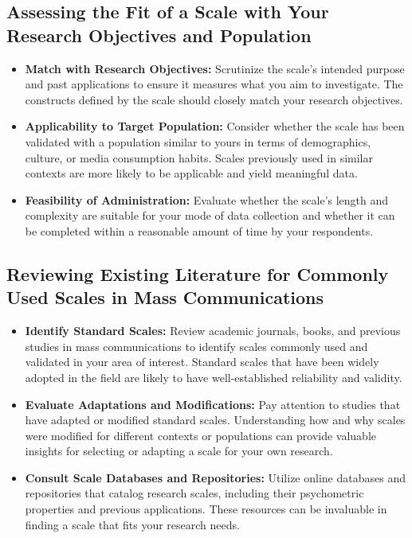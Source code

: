 \documentclass[
]{book}
\begin{document}
\hypertarget{assessing-the-fit-of-a-scale-with-your-research-objectives-and-population}{%
\subsection*{Assessing the Fit of a Scale with Your Research Objectives and Population}\label{assessing-the-fit-of-a-scale-with-your-research-objectives-and-population}}

\begin{itemize}
\item
  \textbf{Match with Research Objectives:} Scrutinize the scale's intended purpose and past applications to ensure it measures what you aim to investigate. The constructs defined by the scale should closely match your research objectives.
\item
  \textbf{Applicability to Target Population:} Consider whether the scale has been validated with a population similar to yours in terms of demographics, culture, or media consumption habits. Scales previously used in similar contexts are more likely to be applicable and yield meaningful data.
\item
  \textbf{Feasibility of Administration:} Evaluate whether the scale's length and complexity are suitable for your mode of data collection and whether it can be completed within a reasonable amount of time by your respondents.
\end{itemize}

\hypertarget{reviewing-existing-literature-for-commonly-used-scales-in-mass-communications}{%
\subsection{Reviewing Existing Literature for Commonly Used Scales in Mass Communications}\label{reviewing-existing-literature-for-commonly-used-scales-in-mass-communications}}

\begin{itemize}
\item
  \textbf{Identify Standard Scales:} Review academic journals, books, and previous studies in mass communications to identify scales commonly used and validated in your area of interest. Standard scales that have been widely adopted in the field are likely to have well-established reliability and validity.
\item
  \textbf{Evaluate Adaptations and Modifications:} Pay attention to studies that have adapted or modified standard scales. Understanding how and why scales were modified for different contexts or populations can provide valuable insights for selecting or adapting a scale for your own research.
\item
  \textbf{Consult Scale Databases and Repositories:} Utilize online databases and repositories that catalog research scales, including their psychometric properties and previous applications. These resources can be invaluable in finding a scale that fits your research needs.
\end{itemize}
\end{document}
